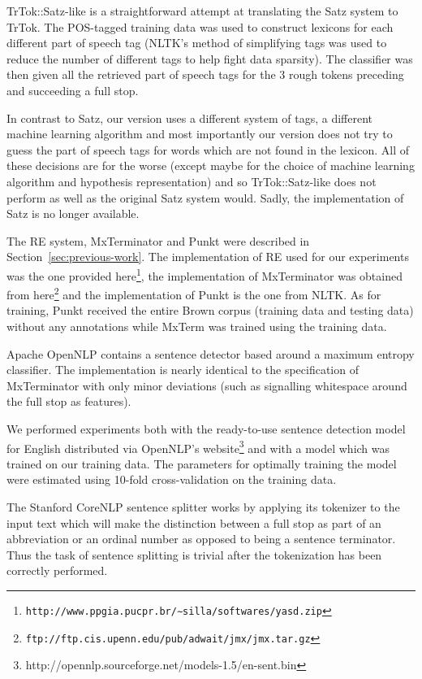 TrTok::Satz-like is a straightforward attempt at translating the Satz
system to TrTok. The POS-tagged training data was used to construct
lexicons for each different part of speech tag (NLTK's method of
simplifying tags was used to reduce the number of different tags to
help fight data sparsity). The classifier was then given all the
retrieved part of speech tags for the 3 rough tokens preceding and
succeeding a full stop.

In contrast to Satz, our version uses a different system of tags, a
different machine learning algorithm and most importantly our version
does not try to guess the part of speech tags for words which are not
found in the lexicon. All of these decisions are for the worse (except
maybe for the choice of machine learning algorithm and hypothesis
representation) and so TrTok::Satz-like does not perform as well as
the original Satz system would. Sadly, the implementation of Satz is
no longer available.

The RE system, MxTerminator and Punkt were described in
Section~\ref{sec:previous-work}. The implementation of RE used for our
experiments was the one provided
here\footnote{\texttt{http://www.ppgia.pucpr.br/∼silla/softwares/yasd.zip}},
the implementation of MxTerminator was obtained from
here\footnote{\texttt{ftp://ftp.cis.upenn.edu/pub/adwait/jmx/jmx.tar.gz}}
and the implementation of Punkt is the one from NLTK. As for training,
Punkt received the entire Brown corpus (training data and testing
data) without any annotations while MxTerm was trained using the
training data.

Apache OpenNLP contains a sentence detector based around a maximum
entropy classifier. The implementation is nearly identical to the
specification of MxTerminator with only minor deviations (such as
signalling whitespace around the full stop as features).

We performed experiments both with the ready-to-use sentence detection
model for English distributed via OpenNLP's
website\footnote{http://opennlp.sourceforge.net/models-1.5/en-sent.bin}
and with a model which was trained on our training data. The
parameters for optimally training the model were estimated using
10-fold cross-validation on the training data.

The Stanford CoreNLP sentence splitter works by applying its tokenizer
to the input text which will make the distinction between a full stop
as part of an abbreviation or an ordinal number as opposed to being a
sentence terminator. Thus the task of sentence splitting is trivial
after the tokenization has been correctly performed.

